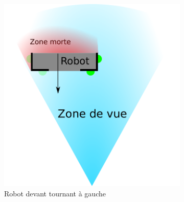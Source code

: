 \begin{itemize}
\begin{figure}[H]
\begin{subfigure}[h]{0.35\textwidth}
					        \includegraphics[width=\textwidth]{Graphics/casClignotants_AG.pdf}
					        \caption{Robot devant tournant à gauche}
					    \end{subfigure}
					    ~
					    \begin{subfigure}[h]{0.2\textwidth}

\end{subfigure}
\end{figure}
\end{itemize}
